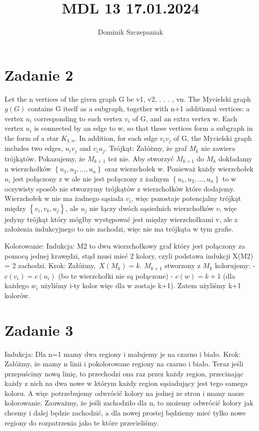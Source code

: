 \documentclass[12pt]{article}
\title{MDL 13 17.01.2024}
\author{Dominik Szczepaniak}
\newcommand{\set}[1]{\left \{ #1 \right \}}				%
\begin{document}
\maketitle

\bgroup\obeylines
\section{Zadanie 2}%
Let the n vertices of the given graph G be v1, v2, . . . , vn. The Mycielski graph $y(G)$ contains G itself as a subgraph, together with n+1 additional vertices: a vertex $u_i$ corresponding to each vertex $v_i$ of G, and an extra vertex w. Each vertex $u_i$ is connected by an edge to w, so that these vertices form a subgraph in the form of a star $K_{1,n}$. In addition, for each edge $v_iv_j$ of G, the Mycielski graph includes two edges, $u_iv_j$ and $v_iu_j$. 
Trójkąt:
Załóżmy, że graf $M_k$ nie zawiera trójkątów. Pokazujemy, że $M_{k+1}$ też nie. Aby stworzyć $M_{k+1}$ do $M_k$ dokładamy n wierzchołków $\set{u_1, u_2, ..., u_n}$ oraz wierzchołek w. Ponieważ każdy wierzchołek $u_i$ jest połączony z w ale nie jest połączony z żadnym $\set{u_1, u_2, ..., u_n}$ to w oczywisty sposób nie stworzymy trójkątów z wierzchołków które dodajemy. Wierzchołek w nie ma żadnego sąsiada $v_i$, więc pozostaje potencjalny trójkąt między $\set{v_i, v_k, u_j}$, ale $u_j$ nie łączy dwóch sąsiednich wierzchołków $v$, więc jedyny trójkąt który mógłby występować jest między wierzchołkami v, ale z założenia indukcyjnego to nie zachodzi, więc nie ma trójkąta w tym grafie.

Kolorowanie:
Indukcja:
M2 to dwu wierzchołkowy graf który jest połączony za pomocą jednej krawędzi, stąd musi mieć 2 kolory, czyli podstawa indukcji X(M2) = 2 zachodzi.
Krok:
Załóżmy, $X(M_k) = k$. $M_{k+1}$ stworzony z $M_k$ kolorujemy:
- $c(v_i) = c(u_i)$ (bo te wierzchołki nie są połączone)
- $c(w) = k + 1$ (dla każdego $w_i$ użyliśmy i-ty kolor więc dla w zostaje k+1).
Zatem użyliśmy k+1 kolorów.

\section{Zadanie 3}%
Indukcja:
Dla n=1 mamy dwa regiony i malujemy je na czarno i biało.
Krok:
Załóżmy, że mamy n linii i pokolorowane regiony na czarno i biało.
Teraz jeśli przepuścimy nową linię, to przechodzi ona raz przez każdy region, przecinając każdy z nich na dwa nowe w którym każdy region sąsiadujący jest tego samego koloru. A więc potrzebujemy odwrócić kolory na jednej ze stron i mamy nasze kolorowanie. Zauważmy, że jeśli zachodziło dla n, to możemy odwrócić kolory jak chcemy i dalej będzie zachodzić, a dla nowej prostej będziemy mieć tylko nowe regiony do rozpatrzenia jako te które przecieliśmy.
\end{document}
